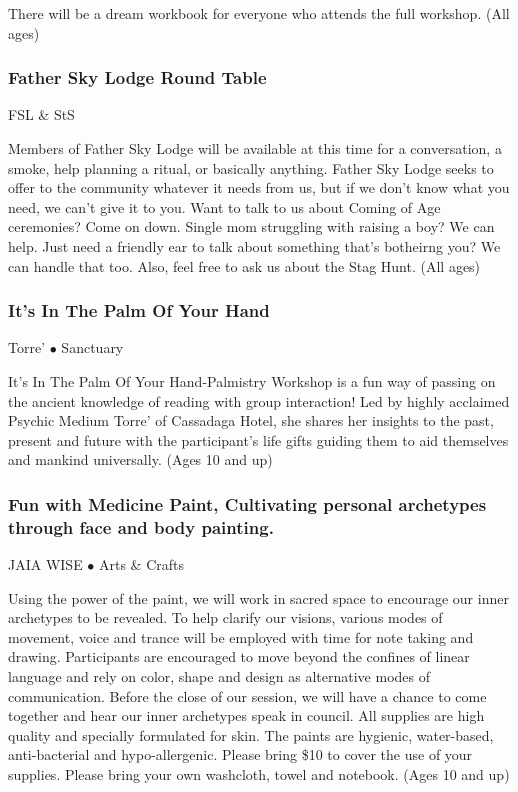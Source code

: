 There will be a dream workbook for everyone who attends the full workshop. {\small (All ages)}

\subsubsection{Father Sky Lodge Round Table}
\label{Fri-Sage1}
{\small  FSL \& StS}

 Members of Father Sky Lodge will be available at this time for a conversation, a smoke, help planning a ritual, or basically anything. Father Sky Lodge seeks to offer to the community whatever it needs from us, but if we don't know what you need, we can't give it to you. Want to talk to us about Coming of Age ceremonies? Come on down. Single mom struggling with raising a boy? We can help. Just need a friendly ear to talk about something that's botheirng you? We can handle that too.  Also, feel free to ask us about the Stag Hunt. {\small (All ages)}

\subsubsection{It's In The Palm Of Your Hand}
\label{Fri-Torre1}
{\small Torre' $\bullet$  Sanctuary}

 It's In The Palm Of Your Hand-Palmistry Workshop is a fun way of passing on the ancient knowledge of reading with group interaction!
Led by highly acclaimed Psychic Medium Torre' of Cassadaga Hotel, she shares her insights to the past, present and future with the participant's life gifts guiding them to aid themselves and mankind universally. {\small (Ages 10 and up)}

\subsubsection{Fun with Medicine Paint, Cultivating  personal archetypes through face and body painting.}
\label{Fri-Wise1}
{\small JAIA WISE $\bullet$  Arts \& Crafts}

 Using the power of the paint, we will work in sacred space to encourage our inner archetypes to be revealed. To help clarify our visions, various modes of movement, voice and trance will be employed with time for note taking and drawing. Participants are encouraged to move beyond the confines of linear language and rely on color, shape and design as alternative modes of communication. Before the close of our session, we will have a chance to come together and hear our inner archetypes speak in council.
All supplies are high quality and specially formulated for skin. The paints are hygienic, water-based, anti-bacterial and hypo-allergenic. Please bring \$10 to cover the use of your supplies.
Please bring your own washcloth, towel and notebook. {\small (Ages 10 and up)}

